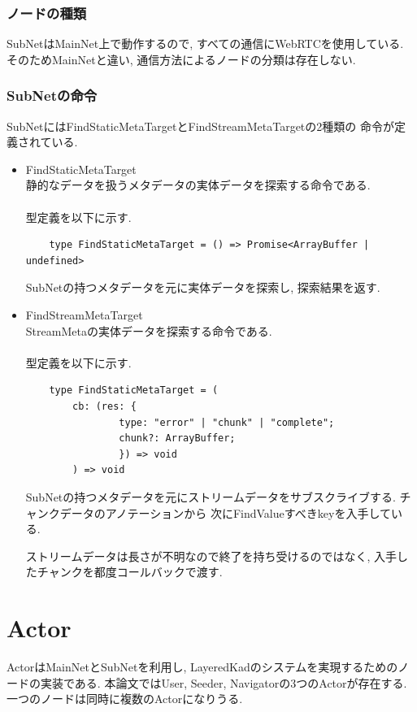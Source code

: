\documentclass[sotsuron]{jcsie}
\begin{document}
\subsubsection{ノードの種類}
SubNetはMainNet上で動作するので, すべての通信にWebRTCを使用している.
そのためMainNetと違い, 通信方法によるノードの分類は存在しない.

\subsubsection{SubNetの命令}
SubNetにはFindStaticMetaTargetとFindStreamMetaTargetの2種類の
命令が定義されている.
\begin{itemize}
	\item {FindStaticMetaTarget}\\
	      静的なデータを扱うメタデータの実体データを探索する命令である.
	      \\\\
	      型定義を以下に示す.
	      \begin{lstlisting}
	type FindStaticMetaTarget = () => Promise<ArrayBuffer | undefined>
	      \end{lstlisting}
	      SubNetの持つメタデータを元に実体データを探索し, 
	      探索結果を返す.
	      \\
	\item {FindStreamMetaTarget}\\
	      StreamMetaの実体データを探索する命令である.
	      \\\\
	      型定義を以下に示す.
	      \begin{lstlisting}
	type FindStaticMetaTarget = (
		cb: (res: {
				type: "error" | "chunk" | "complete";
				chunk?: ArrayBuffer;
				}) => void
		) => void
	      \end{lstlisting}
	      SubNetの持つメタデータを元にストリームデータをサブスクライブする.
	      チャンクデータのアノテーションから
	      次にFindValueすべきkeyを入手している.
	      	      	
	      ストリームデータは長さが不明なので終了を持ち受けるのではなく, 
	      入手したチャンクを都度コールバックで渡す.
\end{itemize}

\section{Actor}
ActorはMainNetとSubNetを利用し, 
LayeredKadのシステムを実現するためのノードの実装である.
本論文ではUser, Seeder, Navigatorの3つのActorが存在する.
一つのノードは同時に複数のActorになりうる.
\end{document}
